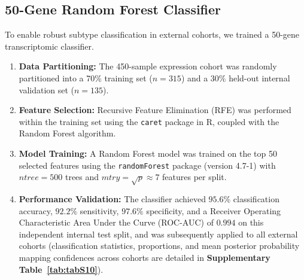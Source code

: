 \documentclass[11pt,a4paper]{article}
\begin{document}
\subsection{50-Gene Random Forest Classifier}
To enable robust subtype classification in external cohorts, we trained a 50-gene transcriptomic classifier.
\begin{enumerate}
    \item \textbf{Data Partitioning:} The 450-sample expression cohort was randomly partitioned into a 70\% training set ($n=315$) and a 30\% held-out internal validation set ($n=135$).
    \item \textbf{Feature Selection:} Recursive Feature Elimination (RFE) was performed within the training set using the \texttt{caret} package in R, coupled with the Random Forest algorithm.
    \item \textbf{Model Training:} A Random Forest model was trained on the top 50 selected features using the \texttt{randomForest} package (version 4.7-1) with $ntree = 500$ trees and $mtry = \sqrt{p} \approx 7$ features per split.
    \item \textbf{Performance Validation:} The classifier achieved $95.6\%$ classification accuracy, $92.2\%$ sensitivity, $97.6\%$ specificity, and a Receiver Operating Characteristic Area Under the Curve (ROC-AUC) of $0.994$ on this independent internal test split, and was subsequently applied to all external cohorts (classification statistics, proportions, and mean posterior probability mapping confidences across cohorts are detailed in \textbf{Supplementary Table~\ref{tab:tabS10}}).
\end{enumerate}
\end{document}
